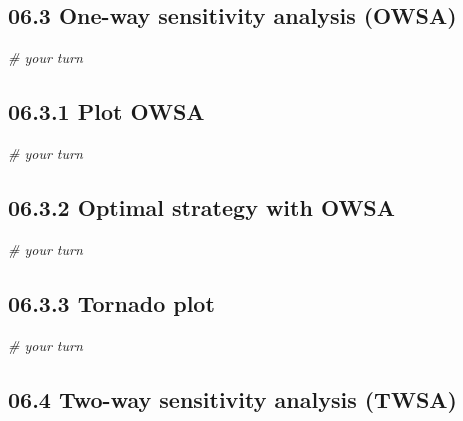 \documentclass[
]{article}
\newenvironment{Shaded}{\begin{snugshade}}{\end{snugshade}}
\newcommand{\CommentTok}[1]{\textcolor[rgb]{0.56,0.35,0.01}{\textit{#1}}}
\begin{document}
\hypertarget{one-way-sensitivity-analysis-owsa}{%
\subsection{06.3 One-way sensitivity analysis
(OWSA)}\label{one-way-sensitivity-analysis-owsa}}

\begin{Shaded}
\begin{Highlighting}[]
\CommentTok{# your turn}
\end{Highlighting}
\end{Shaded}

\hypertarget{plot-owsa}{%
\subsection{06.3.1 Plot OWSA}\label{plot-owsa}}

\begin{Shaded}
\begin{Highlighting}[]
\CommentTok{# your turn}
\end{Highlighting}
\end{Shaded}

\hypertarget{optimal-strategy-with-owsa}{%
\subsection{06.3.2 Optimal strategy with
OWSA}\label{optimal-strategy-with-owsa}}

\begin{Shaded}
\begin{Highlighting}[]
\CommentTok{# your turn}
\end{Highlighting}
\end{Shaded}

\hypertarget{tornado-plot}{%
\subsection{06.3.3 Tornado plot}\label{tornado-plot}}

\begin{Shaded}
\begin{Highlighting}[]
\CommentTok{# your turn}
\end{Highlighting}
\end{Shaded}

\hypertarget{two-way-sensitivity-analysis-twsa}{%
\subsection{06.4 Two-way sensitivity analysis
(TWSA)}\label{two-way-sensitivity-analysis-twsa}}
\end{document}
